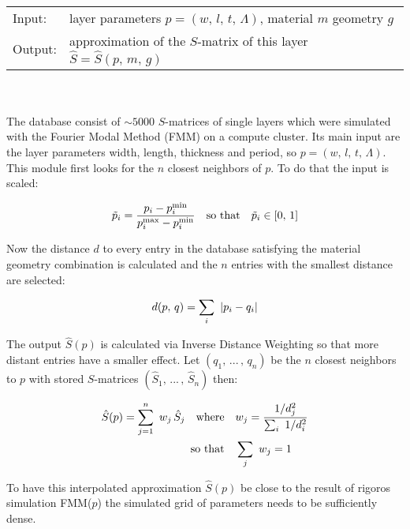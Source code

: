 \begin{tabular}{ll}
    \toprule
    Input: & layer parameters $p = (w, \, l, \, t, \, \Lambda)$, material $m$ geometry $g$ \\
    Output: & approximation of the $S$-matrix of this layer $\hat{S} = \hat{S}(p, \, m, \, g)$\\
    \bottomrule
\end{tabular}
\\
\\
The database consist of $\sim 5000$ $S$-matrices of single layers which were simulated with the Fourier Modal Method (FMM) on a compute cluster. Its main input are the layer parameters width, length, thickness and period, so $p = (w, \, l, \, t, \, \Lambda)$. This module first looks for the $n$ closest neighbors of $p$. To do that the input is scaled:

\begin{equation}
    \tilde{p}_i = \frac{p_i - p_i^\s{min}}{p_i^\s{max} - p_i^\s{min}}
    \qq{so that} \tilde{p}_i \in [0, \, 1]
\end{equation}

\noindent
Now the distance $d$ to every entry in the database satisfying the material geometry combination is calculated and the $n$ entries with the smallest distance are selected:

\begin{equation}
    d(p, \,q) = \sum_i \ \qty|p_i - q_i|
\end{equation}

\noindent
The output $\hat{S}(p)$ is calculated via Inverse Distance Weighting \cite{Shepard1968} so that more distant entries have a smaller effect. Let
$(q_1, \, ... \, , \, q_n)$ be the $n$ closest neighbors to $p$ with stored $S$-matrices
$(\hat{S}_1, \, ... \, , \, \hat{S}_n)$
then:

\begin{equation}
\begin{aligned}
    \hat{S}(p) = \sum_{j=1}^n \ w_j \, \hat{S}_j
    \qq{where}& w_j = \frac{1 / d_j^2}{\sum_i \ 1 / d^2_i} \\
    \qq*{so that} &\sum_j \ w_j = 1
\end{aligned}
\end{equation}

\noindent
To have this interpolated approximation $\hat{S}(p)$ be close to the result of rigoros simulation FMM($p$) the simulated grid of parameters needs to be sufficiently dense. 
